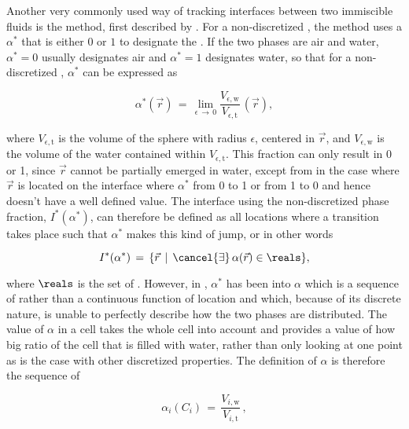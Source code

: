 \label{sec:vof}

Another very commonly used way of tracking interfaces between two immiscible fluids is the \VOF method, first described by \citet{Hirt1981}. For a non-discretized \PDE, the \VOF method uses a  $\alpha^*$ that is either $0$ or $1$ to designate the \phase. If the two phases are air and water, $\alpha^* = 0$ usually designates air and $\alpha^* = 1$ designates water, so that for a non-discretized \PDE, $\alpha^*$ can be expressed as

\begin{equation} \label{eq:phase_fraction_continuous}
\alpha^*(\vec{r}) \,=\, \lim_{\epsilon\,\rightarrow\,0} \frac{V_{\epsilon,\text{w}}}{V_{\epsilon,\text{t}}}\,(\vec{r}),
\end{equation}

where $V_{\epsilon,\text{t}}$ is the volume of the sphere with radius $\epsilon$, centered in $\vec{r}$, and $V_{\epsilon,\text{w}}$ is the volume of the water contained within $V_{\epsilon,\text{t}}$. This fraction can only result in 0 or 1, since $\vec{r}$ cannot be partially emerged in water, except from in the case where $\vec{r}$ is located on the interface where $\alpha^*$  from 0 to 1 or from 1 to 0 and hence doesn't have a well defined value. The interface using the non-discretized phase fraction, $I^*(\alpha^*)$, can therefore be defined as all locations where a transition takes place such that $\alpha^*$ makes this kind of jump, or in other words

\begin{equation} \label{eq:vof_interface_continuous}
I^*(\alpha^*) \,=\, \{\vec{r} \,\mid\, \cancel{\exists}\,\alpha(\vec{r})\in\reals\},
\end{equation}

where $\reals$ is the set of . However, in \thisprojectwork, $\alpha^*$ has been \discretized into $\alpha$ which is a sequence of  rather than a continuous function of location and which, because of its discrete nature, is unable to perfectly describe how the two phases are distributed. The value of $\alpha$ in a cell takes the whole cell into account and provides a value of how big ratio of the cell that is filled with water, rather than only looking at one point as is the case with other discretized properties. The definition of $\alpha$ is therefore the sequence of

\begin{equation} \label{eq:phase_fraction_discretized}
\alpha_i(C_i) \,=\, \frac{V_{i,\text{w}}}{V_{i,\text{t}}}\,,
\end{equation}

